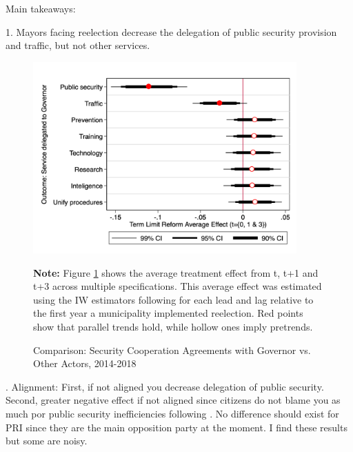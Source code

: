 \documentclass[12pt]{amsart}
\numberwithin{equation}{section}
\theoremstyle{definition}
\theoremstyle{definition}
\theoremstyle{definition}
\begin{document}
Main takeaways: 


1. Mayors facing reelection decrease the delegation of public security provision and traffic, but not other services. 

 \begin{figure}[H]   
\centering
 \caption{Comparison: Security Cooperation Agreements with Governor vs. Other Actors, 2014-2018}
 \label{fig:services}
\includegraphics[width=0.9\textwidth]{../Figures/services.png}
       \captionsetup{justification=centering}
       
 \textbf{Note:} Figure \ref{fig:services} shows the average treatment effect from t, t+1 and t+3 across multiple specifications. This average effect was estimated using the IW estimators following \citet{abraham_sun_2020} for each lead and lag relative to the first year a municipality implemented reelection. Red points show that parallel trends hold, while hollow ones imply pretrends. 
\end{figure}   

. Alignment: First, if not aligned you decrease delegation of public security. Second, greater negative effect if not aligned since citizens do not blame you as much por public security inefficiencies following \citet{ley_2017}. No difference should exist for PRI since they are the main opposition party at the moment. I find these results but some are noisy.
\end{document}
